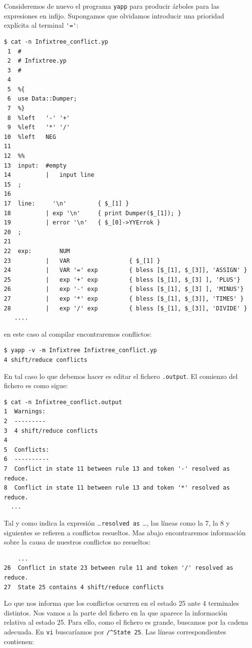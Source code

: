 \begin{example}
Consideremos de nuevo el programa \verb|yapp| para producir
árboles para las expresiones en infijo. Supongamos que olvidamos
introducir una prioridad explícita al terminal \verb|'='|:
\begin{verbatim}
$ cat -n Infixtree_conflict.yp
 1  #
 2  # Infixtree.yp
 3  #
 4
 5  %{
 6  use Data::Dumper;
 7  %}
 8  %left   '-' '+'
 9  %left   '*' '/'
10  %left   NEG
11
12  %%
13  input:  #empty
14          |   input line
15  ;
16
17  line:     '\n'         { $_[1] }
18          | exp '\n'     { print Dumper($_[1]); }
19          | error '\n'   { $_[0]->YYErrok }
20  ;
21
22  exp:        NUM
23          |   VAR                 { $_[1] }
24          |   VAR '=' exp         { bless [$_[1], $_[3]], 'ASSIGN' }
25          |   exp '+' exp         { bless [$_[1], $_[3] ], 'PLUS'}
26          |   exp '-' exp         { bless [$_[1], $_[3] ], 'MINUS'}
27          |   exp '*' exp         { bless [$_[1], $_[3]], 'TIMES' }
28          |   exp '/' exp         { bless [$_[1], $_[3]], 'DIVIDE' }
   ....
\end{verbatim}
en este caso al compilar encontraremos conflictos:
\begin{verbatim}
$ yapp -v -m Infixtree Infixtree_conflict.yp
4 shift/reduce conflicts
\end{verbatim}
En tal caso lo que debemos hacer es editar el fichero \verb|.output|.
El comienzo del fichero es como sigue:
\begin{verbatim}
$ cat -n Infixtree_conflict.output
1  Warnings:
2  ---------
3  4 shift/reduce conflicts
4
5  Conflicts:
6  ----------
7  Conflict in state 11 between rule 13 and token '-' resolved as reduce.
8  Conflict in state 11 between rule 13 and token '*' resolved as reduce.
  ...
\end{verbatim}
Tal y como indica la expresión \ldots \verb|resolved as| \ldots,
las líneas como la 7, la 8 y siguientes se refieren a conflictos resueltos.
Mas abajo encontraremos información sobre 
la causa de nuestros conflictos no resueltos:
\begin{verbatim}
    ...
26  Conflict in state 23 between rule 11 and token '/' resolved as reduce.
27  State 25 contains 4 shift/reduce conflicts
\end{verbatim}
Lo que nos informa que los conflictos 
ocurren en el estado 25 ante 4 terminales
distintos. Nos vamos a la parte del fichero 
en la que aparece la información relativa al estado 25. Para ello,
como el fichero es grande, buscamos por la cadena adecuada.
En \verb|vi| buscaríamos por \verb|/^State 25|. Las líneas
correspondientes contienen:


\end{example}
